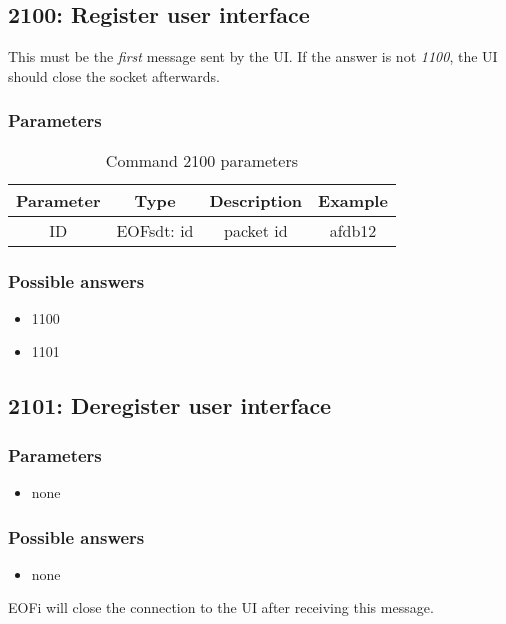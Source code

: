 \documentclass[12pt,a4paper]{book}
\begin{document}
\subsection{2100: Register user interface}
This must be the \emph{first} message sent by the UI. If the answer is not
\emph{1100}, the UI should close the socket afterwards.

\subsubsection{Parameters}
\begin{longtable}{|c|c|c|c|}
\caption{Command 2100 parameters}\\
\hline
\textbf{Parameter} & \textbf{Type} & \textbf{Description} & \textbf{Example}\\
\hline
ID & EOFsdt: id & packet id & afdb12\\
\hline
\end{longtable}

\subsubsection{Possible answers}
\begin{itemize}
\item 1100
\item 1101
\end{itemize}
\subsection{2101: Deregister user interface}

\subsubsection{Parameters}
\begin{itemize}
\item none
\end{itemize}

\subsubsection{Possible answers}
\begin{itemize}
\item none
\end{itemize}

EOFi will close the connection to the UI after receiving this message.
\end{document}
